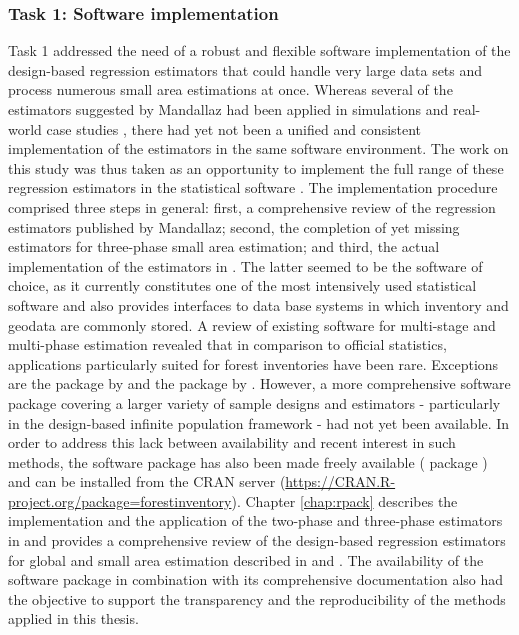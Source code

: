 \subsubsection{Task 1: Software implementation} %


Task 1 addressed the need of a robust and flexible software implementation of the design-based regression estimators that could handle very large data sets and process numerous small area estimations at once. Whereas several of the estimators suggested by Mandallaz had been applied in simulations and real-world case studies \citep{mandallaz2013a, mandallaz2013b, mandallaz2013c, massey2014a, massey2015a, massey2015b}, there had yet not been a unified and consistent implementation of the estimators in the same software environment. The work on this study was thus taken as an opportunity to implement the full range of these regression estimators in the statistical software  \citep{R}. The implementation procedure comprised three steps in general: first, a comprehensive review of the regression estimators published by Mandallaz; second, the completion of yet missing estimators for three-phase small area estimation; and third, the actual implementation of the estimators in . The latter seemed to be the software of choice, as it currently constitutes one of the most intensively used statistical software and also provides interfaces to data base systems in which inventory and geodata are commonly stored. A review of existing software for multi-stage and multi-phase estimation revealed that in comparison to official statistics, applications particularly suited for forest inventories have been rare. Exceptions are the  package  by \citet{josae2015} and the  package by \citet{cullmann2016}. However, a more comprehensive software package covering a larger variety of sample designs and estimators - particularly in the design-based infinite population framework - had not yet been available. In order to address this lack between availability and recent interest in such methods, the software package has also been made freely available ( package ) and can be installed from the CRAN server (\url{https://CRAN.R-project.org/package=forestinventory}). Chapter \ref{chap:rpack} describes the implementation and the application of the two-phase and three-phase estimators in  and provides a comprehensive review of the design-based regression estimators for global and small area estimation described in \citet{mandallaz2008, mandallaz2013a, mandallaz2013c} and \citet{mandallaz2013b}. The availability of the software package in combination with its comprehensive documentation also had the objective to support the transparency and the reproducibility of the methods applied in this thesis.


